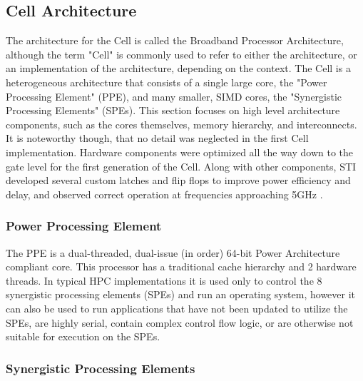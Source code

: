 \documentclass{sig-alternate-05-2015}
\begin{document}
\subsection{Cell Architecture}

The architecture for the Cell is called the Broadband Processor Architecture, although the term "Cell" is commonly used to refer to either the architecture, or an implementation of the architecture, depending on the context. The Cell is a heterogeneous architecture that consists of a single large core, the "Power Processing Element" (PPE), and many smaller, SIMD cores, the "Synergistic Processing Elements" (SPEs). This section focuses on high level architecture components, such as the cores themselves, memory hierarchy, and interconnects. It is noteworthy though, that no detail was neglected in the first Cell implementation. Hardware components were optimized all the way down to the gate level for the first generation of the Cell. Along with other components, STI developed several custom latches and flip flops to improve power efficiency and delay, and observed correct operation at frequencies approaching 5GHz \cite{pham2005design}.

\subsubsection{Power Processing Element}

The PPE is a dual-threaded, dual-issue (in order) 64-bit Power Architecture compliant core. This processor has a traditional cache hierarchy and 2 hardware threads. In typical HPC implementations it is used only to control the 8 synergistic processing elements (SPEs) and run an operating system, however it can also be used to run applications that have not been updated to utilize the SPEs, are highly serial, contain complex control flow logic, or are otherwise not suitable for execution on the SPEs.

\subsubsection{Synergistic Processing Elements}
\end{document}
